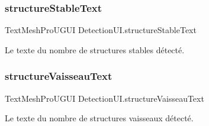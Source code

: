 \subsubsection{\texorpdfstring{structure\+Stable\+Text}{structureStableText}}
{\footnotesize\ttfamily Text\+Mesh\+Pro\+U\+G\+UI Detection\+U\+I.\+structure\+Stable\+Text\hspace{0.3cm}{\ttfamily [private]}}



Le texte du nombre de structures stables détecté. 

\mbox{\label{class_detection_u_i_ab98e67e9d4cadacbab30fe67ecc205f0}} 
\subsubsection{\texorpdfstring{structure\+Vaisseau\+Text}{structureVaisseauText}}
{\footnotesize\ttfamily Text\+Mesh\+Pro\+U\+G\+UI Detection\+U\+I.\+structure\+Vaisseau\+Text\hspace{0.3cm}{\ttfamily [private]}}



Le texte du nombre de structures vaisseaux détecté. 

